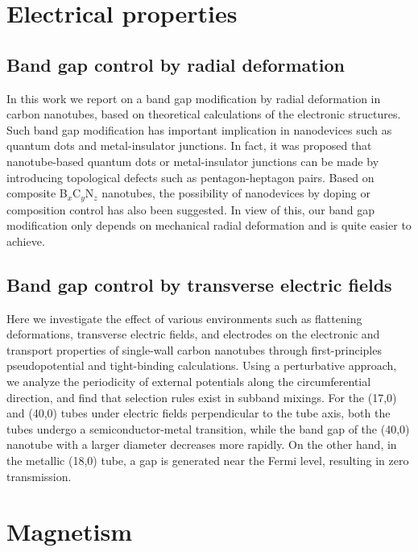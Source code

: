 \documentclass[doctor,english,final]{kaist-ucs}
\begin{document}
\chapter{Electrical properties}

\section{Band gap control by radial deformation}

In this work we report on a band gap modification by radial deformation
in carbon nanotubes, based on theoretical calculations of the electronic
structures.
Such band gap modification has important implication in nanodevices
such as quantum dots and metal-insulator junctions.
In fact, it was proposed that nanotube-based quantum dots or
metal-insulator junctions can be made by introducing topological
defects such as pentagon-heptagon pairs.
Based on composite B$_{x}$C$_{y}$N$_{z}$ nanotubes, the possibility of
nanodevices by doping or composition control has also been
suggested.
In view of this, our band gap modification only depends on mechanical
radial deformation and is quite easier to achieve.


\section{Band gap control by transverse electric fields}

Here we investigate the effect of various environments such as
flattening deformations, transverse electric fields, and electrodes on the
electronic and transport properties of single-wall carbon nanotubes through
first-principles pseudopotential and tight-binding calculations.
Using a perturbative approach, we analyze the periodicity of external
potentials along the circumferential direction, and find that selection
rules exist in subband mixings.
For the (17,0) and (40,0) tubes under electric fields perpendicular to the
tube axis, both the tubes undergo a semiconductor-metal transition, while
the band gap of the (40,0) nanotube with a larger diameter decreases more
rapidly.
On the other hand, in the metallic (18,0) tube, a gap is generated near
the Fermi level, resulting in zero transmission.




\chapter{Magnetism}
\end{document}

